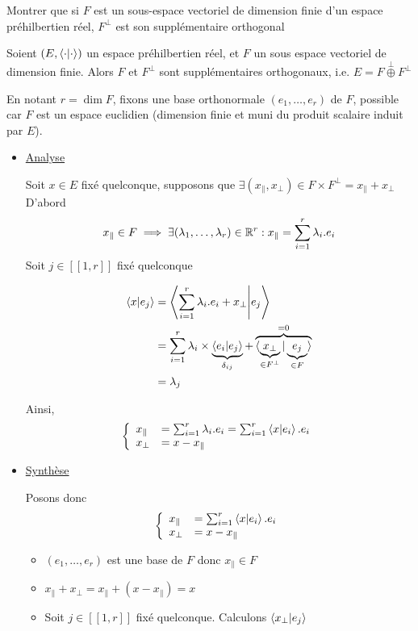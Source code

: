 \documentclass{article}
\renewenvironment{question_kholle}[2][ ]
{
	\subsection{\texorpdfstring{#2}{}}
	\notblank{#1}
	{
		\noindent #1
		\bigbreak
	}
	{}
	\begin{proof}
}
{
	\end{proof}
}
\begin{document}
\begin{question_kholle}{Montrer que si $F$ est un sous-espace vectoriel de dimension finie d'un espace préhilbertien réel, $F^{\perp}$ est son supplémentaire orthogonal}
	
	
	Soient $(E, \braket{ \cdot | \cdot })$ un espace préhilbertien réel, et $F$ un sous espace vectoriel de dimension finie.
	Alors $F$ et $F^{\perp}$ sont supplémentaires orthogonaux, i.e. $E = F  \overset{\perp}{\oplus} F^{\perp}$
	
	
	
	En notant $r = \dim F$, fixons une base orthonormale $(e_{1}, \dots, e_{r})$ de $F$, possible car $F$ est un espace euclidien (dimension finie et muni du produit scalaire induit par $E$).
	\begin{itemize}[label=$\lozenge$]
		\item \underline{Analyse}
		
		Soit $x \in E$ fixé quelconque, supposons que $\exists (x_{\parallel}, x_{\perp}) \in F \times F^{\perp} = x_{\parallel}+x_{\perp}$
		D'abord $$x_{\parallel} \in F \implies \exists (\lambda_{1}, \dots, \lambda_{r}) \in \mathbb R^{r}: x_{\parallel}= \sum_{i=1}^{r}\lambda_{i}.e_{i}$$
		Soit $j \in [ \! [ 1, r ] \!]$ fixé quelconque
		
		\begin{align*}
			\braket{ x | e_{j} } &=   \left\langle \sum_{i=1}^{r}\lambda_{i}.e_{i} + x_{\perp} \Bigg| e_{j}  \right\rangle   \\
			&= \sum_{i=1}^{r}\lambda_{i}\times \underbrace{ \braket{ e_{i} | e_{j} } }_{ \delta_{ij} }  + \overbrace{ \braket{ \underbrace{ x_{\perp} }_{ \in F^{\perp} } | \underbrace{ e_{j} }_{ \in F } } }^{ =0 }  \\
			&= \lambda_{j}
		\end{align*}
		
		Ainsi, $$\left\{ \begin{array}{ll}
			x_{\parallel} &= \sum_{i=1}^{r}\lambda_{i}.e_{i}= \sum_{i=1}^{r}\braket{ x | e_{i} } . e_{i} \\
			x_{\perp}  &= x - x_{\parallel}
		\end{array}\right.$$
		
		\item \underline{Synthèse}
		
		Posons donc 
		$$\left\{ \begin{array}{ll}
			x_{\parallel} &= \sum_{i=1}^{r} \braket{ x | e_{i} } .e_{i} \\
			x_{\perp} &= x - x_{\parallel}
		\end{array}\right. $$
		\begin{itemize}[label=$\star$]
			\item $(e_{1}, \dots, e_{r})$ est une base de $F$ donc $x_{\parallel} \in F$
			\item $x_{\parallel}+x_{\perp} = x_{\parallel}+ (x - x_{\parallel}) = x$
			\item Soit $j \in [ \! [ 1, r ] \!]$ fixé quelconque. Calculons $\braket{ x_{\perp} | e_{j} }$
			

\end{itemize}
\end{itemize}
\end{question_kholle}
\end{document}
